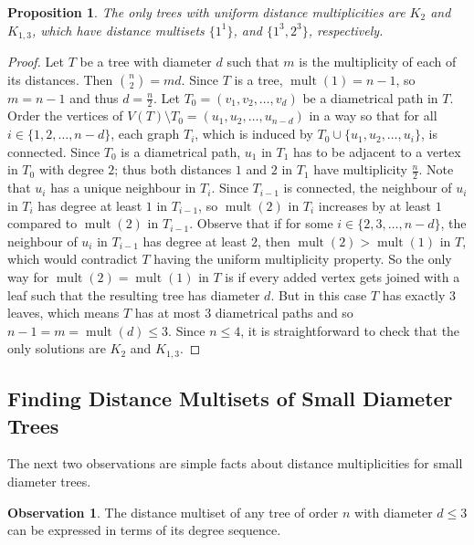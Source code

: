 \documentclass[12]{article}
\DeclareMathOperator{\mult}{mult}
\newtheorem{prop}[thm]{Proposition}
\theoremstyle{definition}
\newtheorem{obs}{Observation}
\begin{document}
	\begin{prop}
		The only trees with uniform distance multiplicities are $K_2$ and $K_{1,3}$, which have distance multisets $\{1^1\}$, and $\{1^3,2^3\}$, respectively.
	\end{prop}

	\begin{proof}
		Let $T$ be a tree with diameter $d$ such that $m$ is the multiplicity of each of its distances.  Then ${n \choose 2} = md$.  Since $T$ is a tree, $\mult(1) = n-1$, so $m = n-1$ and thus $d = \tfrac{n}{2}$.  Let $T_0 = (v_1, v_2, \ldots, v_d)$ be a diametrical path in $T$.  Order the vertices of $V(T) \setminus T_0 = (u_1, u_2, \ldots, u_{n-d})$ in a way so that for all $i \in \{1, 2, \ldots, n-d\}$, each graph $T_i$, which is induced by $T_0 \cup \{u_1, u_2, \ldots, u_i\}$, is connected.  Since $T_0$ is a diametrical path, $u_1$ in $T_1$ has to be adjacent to a vertex in $T_{0}$ with degree $2$; thus both distances $1$ and $2$ in $T_1$ have multiplicity $\tfrac{n}{2}$.  Note that $u_i$ has a unique neighbour in $T_i$.  Since $T_{i-1}$ is connected, the neighbour of $u_i$ in $T_i$ has degree at least $1$ in $T_{i-1}$, so $\mult(2)$ in $T_i$ increases by at least $1$ compared to $\mult(2)$ in $T_{i-1}$.  Observe that if for some $i \in \{2, 3, \ldots, n-d\}$, the neighbour of $u_i$ in $T_{i-1}$ has degree at least $2$, then $\mult(2) > \mult(1)$ in $T$, which would contradict $T$ having the uniform multiplicity property.  So the only way for $\mult(2) = \mult(1)$ in $T$ is if every added vertex gets joined with a leaf such that the resulting tree has diameter $d$.  But in this case $T$ has exactly $3$ leaves, which means $T$ has at most $3$ diametrical paths and so $n-1 = m = \mult(d) \leq 3$.  Since $n \leq 4$, it is straightforward to check that the only solutions are $K_2$ and $K_{1,3}$.  \qedhere
	\end{proof}
	
	\subsection{Finding Distance Multisets of Small Diameter Trees}
	
	The next two observations are simple facts about distance multiplicities for small diameter trees.
	
	\begin{obs}
		The distance multiset of any tree of order $n$ with diameter $d \leq 3$ can be expressed in terms of its degree sequence.
	\end{obs}
\end{document}
